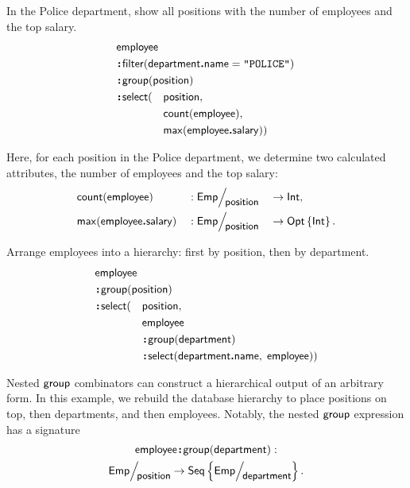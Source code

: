 \begin{example}
    \label{ex:employee-group-position-etc}
    In the Police department, show all positions with the number of employees
    and the top salary.
    \begin{alignat*}{2}
        & \Employee\hidewidth && \\
        & \Apply\Filter(\Department\To\Name = \textliteral{POLICE})\hspace{-15em}&&\hspace{12em} \\
        & \Apply\Group(\Position)\hidewidth && \\
        & \Apply\Select(&& \Position, \\
        & && \Count(\Employee), \\
        & && \Max(\Employee\To\Salary))
    \end{alignat*}
\end{example}

Here, for each position in the Police department, we determine two calculated
attributes, the number of employees and the top salary:
\begin{alignat*}{3}
    & \Count(\Employee) && : \Quotient{\Emp}{\Position} && \to \Int, \\
    & \Max(\Employee\To\Salary) && : \Quotient{\Emp}{\Position} && \to \Opt{\Int}.
\end{alignat*}

\begin{example}
    \label{ex:nested-group}
    Arrange employees into a hierarchy: first by position, then by department.
    \begin{alignat*}{2}
        & \Employee\hidewidth && \\
        & \Apply\Group(\Position)\hidewidth && \\
        & \Apply\Select(&& \Position, \\
        & && \Employee \\
        & && \Apply\Group(\Department) \\
        & && \Apply\Select(\Department\To\Name,\; \Employee))
    \end{alignat*}
\end{example}

Nested $\textup{\textsf{group}}$ combinators can construct a hierarchical output of an arbitrary
form.  In this example, we rebuild the database hierarchy to place positions on
top, then departments, and then employees.  Notably, the nested $\textup{\textsf{group}}$
expression has a signature
\begin{multline*}
    \Employee\Apply\Group(\Department) : \\
    \Quotient{\Emp}{\Position} \to \Seq{\Quotient{\Emp}{\Department}}.
\end{multline*}

